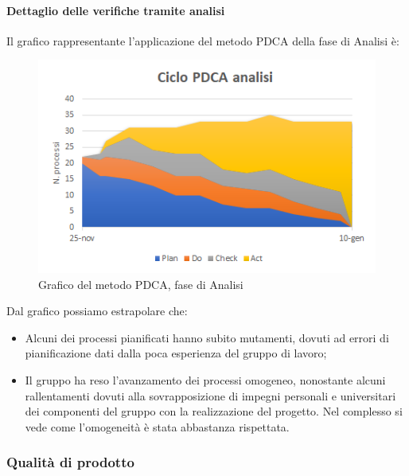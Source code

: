 \paragraph{Dettaglio delle verifiche tramite analisi} \Spazio
Il grafico rappresentante l'applicazione del metodo PDCA della fase di Analisi è:
\begin{figure} [H]
	\centering
	\includegraphics[scale=1]{Img/Ciclo_PDCA}
	\caption{Grafico del metodo PDCA, fase di Analisi}\label{immagine:pdca analisi}
\end{figure}
Dal grafico possiamo estrapolare che:
\begin{itemize}
	\item Alcuni dei processi pianificati hanno subito mutamenti, dovuti ad errori di pianificazione dati dalla poca esperienza del gruppo di lavoro;
	\item Il gruppo ha reso l'avanzamento dei processi omogeneo, nonostante alcuni rallentamenti dovuti alla sovrapposizione di impegni personali e universitari dei componenti del gruppo con la realizzazione del progetto. Nel complesso si vede come l'omogeneità è stata abbastanza rispettata.
\end{itemize}
\subsubsection{Qualità di prodotto}
